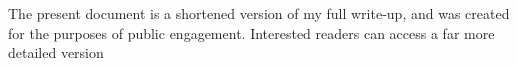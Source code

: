 \documentclass[a4paper, 11pt]{article}
\theoremstyle{plain}
\newtheorem{proposition}[theorem]{Proposition}
\theoremstyle{definition}
\newtheorem{definition}[theorem]{Definition}
\theoremstyle{remark}
\numberwithin{equation}{subsection}
\def\({}
\def\){}
\begin{document}
The present document is a shortened version of my full write-up, and was created for the purposes of public engagement. Interested readers can access a far more detailed version


\begin{comment}  
\section{Preliminaries}
\label{Preliminaries}

\subsection{Preliminaries from Measure Theory}

\subsubsection{Covering Theorems}

We begin by exploring a class of results known as \emph{covering theorems}. The main idea is as follows: starting from a family of covering sets, we wish to select a subfamily with some control on the overlap of the sets. In particular, the sets might be pairwise disjoint or almost disjoint (in the measure-theoretic sense). This may seem similar to the notion of compactness, which we now recall:

\begin{definition}
A topological space \(T\) is \emph{compact} if every open cover contains a finite subcover.
\end{definition}

A simple covering theorem is the following:

\begin{proposition}
Let \(A \subset \mathbb{R}^{n}\) be a bounded set, and fix \(r > 0\). Then there are finitely many elements \(x_{1},\ldots,x_{N}\) such that
\begin{equation}
A \subset \bigcup_{k=1}^{N}B_{r}(x_{k}),
\end{equation}
and every \(x \in A\) is contained in at most \(3^{n}\) of the balls \(B_{r}(x_{k})\).
\end{proposition}

Note that the first part of the proposition follows immediately by compactness,\footnote{Even if A is not compact, it is contained in a compact set.} so the essence of a covering result is controlling the overlap of the balls.

A significant generalisation of the previous result is given by the \emph{Besicovich covering theorem}:


\end{comment}
\end{document}
